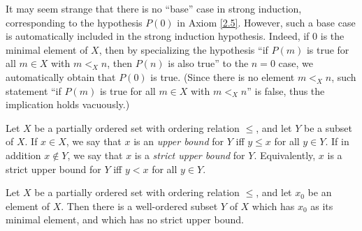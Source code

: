 \begin{remark}\label{8.5.11}
    It may seem strange that there is no ``base'' case in strong induction, corresponding to the hypothesis \(P(0)\) in Axiom \ref{2.5}.
    However, such a base case is automatically included in the strong induction hypothesis.
    Indeed, if \(0\) is the minimal element of \(X\), then by specializing the hypothesis ``if \(P(m)\) is true for all \(m \in X\) with \(m <_X n\), then \(P(n)\) is also true'' to the \(n = 0\) case, we automatically obtain that \(P(0)\) is true.
    (Since there is no element \(m <_X n\), such statement ``if \(P(m)\) is true for all \(m \in X\) with \(m <_X n\)'' is false, thus the implication holds vacuously.)
\end{remark}

\begin{definition}\label{8.5.12}
    Let \(X\) be a partially ordered set with ordering relation \(\leq\), and let \(Y\) be a subset of \(X\).
    If \(x \in X\), we say that \(x\) is an \emph{upper bound} for \(Y\) iff \(y \leq x\) for all \(y \in Y\).
    If in addition \(x \notin Y\), we say that \(x\) is a \emph{strict upper bound} for \(Y\).
    Equivalently, \(x\) is a strict upper bound for \(Y\) iff \(y < x\) for all \(y \in Y\).
\end{definition}

\setcounter{theorem}{13}
\begin{lemma}\label{8.5.14}
    Let \(X\) be a partially ordered set with ordering relation \(\leq\), and let \(x_0\) be an element of \(X\).
    Then there is a well-ordered subset \(Y\) of \(X\) which has \(x_0\) as its minimal element, and which has no strict upper bound.
\end{lemma}

